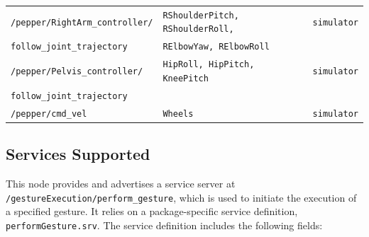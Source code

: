 \documentclass{CSSRforAfrica}
\begin{document}
\begin{longtable}[c]{|l|l|l|}
    \footnotesize{\texttt{/pepper/RightArm\_controller/}} & \footnotesize{\texttt{RShoulderPitch, RShoulderRoll,}} & \footnotesize{\texttt{simulator}} \\ 
\footnotesize{\texttt{follow\_joint\_trajectory}} & \footnotesize{\texttt{RElbowYaw, RElbowRoll}} & \footnotesize{} \\ \hline

    \footnotesize{\texttt{/pepper/Pelvis\_controller/}} & \footnotesize{\texttt{HipRoll, HipPitch, KneePitch}} & \footnotesize{\texttt{simulator}} \\ 
\footnotesize{\texttt{follow\_joint\_trajectory}} & \footnotesize{} & \footnotesize{} \\ \hline

    \footnotesize{\texttt{/pepper/cmd\_vel}} & \footnotesize{\texttt{Wheels}} & \footnotesize{\texttt{simulator}} \\ \hline
\end{longtable}
%

\newpage

\subsection*{Services Supported}
This node provides and advertises a service server at \texttt{/gestureExecution/perform\_gesture}, which is used to initiate the execution of a specified gesture. It relies on a package-specific service definition, \texttt{performGesture.srv}. The service definition includes the following fields:
\end{document}
